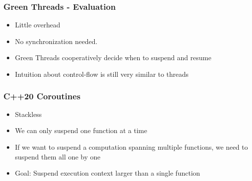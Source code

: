 \documentclass[aspectratio=169]{beamer}
\newif\iftransitions
\newcommand{\cpause}{\iftransitions \pause \fi}
\begin{document}
\begin{frame}
  \frametitle{Green Threads - Evaluation}

  \begin{itemize}
  \item Little overhead \cpause
  \item No synchronization needed. \cpause
  \item Green Threads cooperatively decide when to suspend and resume \cpause
  \item Intuition about control-flow is still very similar to threads
  \end{itemize}
\end{frame}

\begin{frame}
  \frametitle{C++20 Coroutines}

  \begin{itemize}
  \item Stackless
  \item We can only suspend one function at a time
  \item If we want to suspend a computation spanning multiple functions, we need to suspend them all one by one
  \cpause
  \item \alert{Goal: Suspend execution context larger than a single function}
  \end{itemize}
\end{frame}
\end{document}
